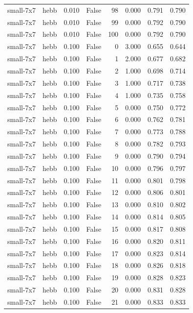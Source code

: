 \begin{tabular}{llrrrrrr}
small-7x7 & hebb & 0.010 & False & 98 & 0.000 & 0.791 & 0.790 \\
small-7x7 & hebb & 0.010 & False & 99 & 0.000 & 0.792 & 0.790 \\
small-7x7 & hebb & 0.010 & False & 100 & 0.000 & 0.792 & 0.790 \\
small-7x7 & hebb & 0.100 & False & 0 & 3.000 & 0.655 & 0.644 \\
small-7x7 & hebb & 0.100 & False & 1 & 2.000 & 0.677 & 0.682 \\
small-7x7 & hebb & 0.100 & False & 2 & 1.000 & 0.698 & 0.714 \\
small-7x7 & hebb & 0.100 & False & 3 & 1.000 & 0.717 & 0.738 \\
small-7x7 & hebb & 0.100 & False & 4 & 1.000 & 0.735 & 0.758 \\
small-7x7 & hebb & 0.100 & False & 5 & 0.000 & 0.750 & 0.772 \\
small-7x7 & hebb & 0.100 & False & 6 & 0.000 & 0.762 & 0.781 \\
small-7x7 & hebb & 0.100 & False & 7 & 0.000 & 0.773 & 0.788 \\
small-7x7 & hebb & 0.100 & False & 8 & 0.000 & 0.782 & 0.793 \\
small-7x7 & hebb & 0.100 & False & 9 & 0.000 & 0.790 & 0.794 \\
small-7x7 & hebb & 0.100 & False & 10 & 0.000 & 0.796 & 0.797 \\
small-7x7 & hebb & 0.100 & False & 11 & 0.000 & 0.801 & 0.798 \\
small-7x7 & hebb & 0.100 & False & 12 & 0.000 & 0.806 & 0.801 \\
small-7x7 & hebb & 0.100 & False & 13 & 0.000 & 0.810 & 0.802 \\
small-7x7 & hebb & 0.100 & False & 14 & 0.000 & 0.814 & 0.805 \\
small-7x7 & hebb & 0.100 & False & 15 & 0.000 & 0.817 & 0.808 \\
small-7x7 & hebb & 0.100 & False & 16 & 0.000 & 0.820 & 0.811 \\
small-7x7 & hebb & 0.100 & False & 17 & 0.000 & 0.823 & 0.814 \\
small-7x7 & hebb & 0.100 & False & 18 & 0.000 & 0.826 & 0.818 \\
small-7x7 & hebb & 0.100 & False & 19 & 0.000 & 0.828 & 0.823 \\
small-7x7 & hebb & 0.100 & False & 20 & 0.000 & 0.831 & 0.828 \\
small-7x7 & hebb & 0.100 & False & 21 & 0.000 & 0.833 & 0.833 \\

\end{tabular}
